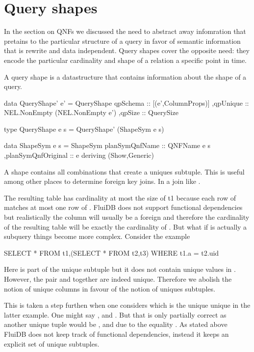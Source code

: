 \section{Query shapes}

In the section on QNFs we discussed the need to abstract away
infomration that pretains to the particular structure of a query in
favor of semantic information that is rewrite and data
independent. Query shapes cover the opposite need: they encode the
particular cardinality and shape of a relation a specific point in
time.

A query shape is a datastructure that contains information about the
shape of a query.

\begin{haskellcode}
  data QueryShape' e' =
    QueryShape
    { qpSchema :: [(e',ColumnProps)]
      ,qpUnique :: NEL.NonEmpty (NEL.NonEmpty e')
      ,qpSize :: QuerySize
    }

  type QueryShape e s = QueryShape' (ShapeSym e s)

  data ShapeSym e s =
    ShapeSym { planSymQnfName :: QNFName e s
      ,planSymQnfOriginal :: e
    }
    deriving (Show,Generic)
\end{haskellcode}

A shape contains all combinations that create a uniques subtuple. This
is useful among other places to determine foreign key joins. In a join
like .

The resulting table has cardinality at most the size of t1 because
each row of  matches at most one row of . FluiDB does not
support functional dependencies but realistically the column  will
usually be a foreign and therefore the cardinality of the resulting
table will be exactly the cardinality of . But what if  is
actually a subquery things become more complex. Consider the example

\begin{sqlcode}
  SELECT *
  FROM t1,(SELECT * FROM t2,t3)
  WHERE t1.a = t2.uid
\end{sqlcode}

Here  is part of the unique subtuple but it does not contain
unique values in . However, the pair  and
 together are indeed unique. Therefore we abolish the notion
of unique columns in favour of the notion of uniques subtuples.

This is taken a step furthen when one considers which is the unique
unique in the latter example. One might say ,
 and . But that is only partially
correct as another unique tuple would be ,
 and  due to the equality . As stated above FluiDB does not keep track of functional
dependencies, instead it keeps an explicit set of unique subtuples.

